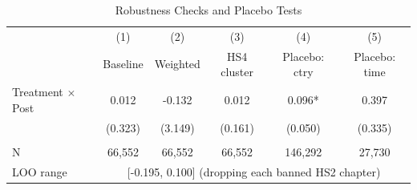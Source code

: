 \begin{table}[htbp]
\centering
\caption{Robustness Checks and Placebo Tests}
\label{tab:robustness}
\small
\begin{tabular}{lccccc}
\toprule
 & (1) & (2) & (3) & (4) & (5) \\
 & Baseline & Weighted & HS4 cluster & Placebo: ctry & Placebo: time \\
\midrule
Treatment $\times$ Post & 0.012 & -0.132 & 0.012 & 0.096* & 0.397 \\
 & (0.323) & (3.149) & (0.161) & (0.050) & (0.335) \\
 & & & & & \\
N & 66,552 & 66,552 & 66,552 & 146,292 & 27,730 \\
\midrule
LOO range & \multicolumn{5}{c}{[-0.195, 0.100] (dropping each banned HS2 chapter)} \\
\bottomrule
\end{tabular}
\par{}
\end{table}
